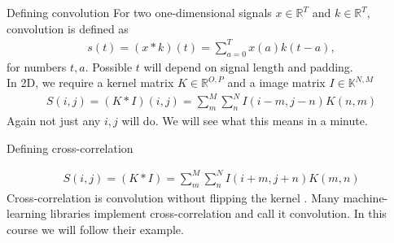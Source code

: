 \documentclass{beamer}
\begin{document}
    \begin{frame}{Defining convolution}
        For two one-dimensional signals $x \in \mathbb{R}^T$
        and $k \in \mathbb{R}^T$, convolution is defined as
        \begin{align}
            s(t) = (x * k)(t) = \sum_{a=0}^{T} x(a)k(t - a),
        \end{align}
        for numbers $t,a$. Possible $t$ will depend on signal length and padding. \\
        In 2D, we require a kernel matrix $K \in \mathbb{R}^{O,P}$ and a image matrix
        $I \in \mathbb{K}^{N,M}$
        \begin{align}
            S(i,j) = (K * I)(i,j) = \sum_m^M \sum_n^N I(i-m, j-n)K(n,m)
        \end{align}
        Again not just any $i,j$ will do. We will see what this means in a minute.
    \end{frame}


    \begin{frame}{Defining cross-correlation}
        
        \begin{align}
            S(i,j) = (K*I) = \sum_m^M \sum_n^N I(i+m, j+n)K(m,n)
        \end{align}
        Cross-correlation is convolution without flipping the kernel \cite{goodfellow2016deep}.
        Many machine-learning libraries implement cross-correlation and
        call it convolution. In this course we will follow their example.
    \end{frame}
\end{document}
